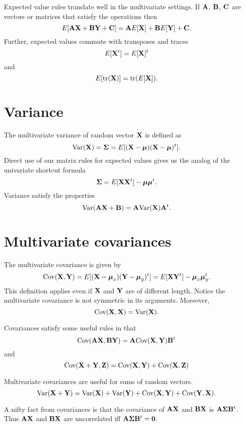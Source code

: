 Expected value rules translate well in the multivariate settings.
If $\mathbf{A}$, $\mathbf{B}$, $\mathbf{C}$ are vectors or matrices that satisfy the operations then 
$$
E[\mathbf{A} \mathbf{X} + \mathbf{B} \mathbf{Y} + \mathbf{C}] = \mathbf{A} E[\mathbf{X}] + \mathbf{B} E[\mathbf{Y}] + \mathbf{C}.
$$
Further, expected values commute with transposes and traces
$$
E[\mathbf{X}^t] = E[\mathbf{X}]^t
$$
and 
$$
E[\mbox{tr}(\mathbf{X})] = \mbox{tr}(E[\mathbf{X}]).
$$

\section{Variance}
The multivariate variance of random vector $\mathbf{X}$ is defined as 
$$
\mbox{Var}(\mathbf{X}) = \boldsymbol{\Sigma} = E[(\mathbf{X} - \boldsymbol{\mu})(\mathbf{X} - \boldsymbol{\mu})^t].
$$
Direct use of our matrix rules for expected values gives us the
analog of the univariate shortcut formula
$$
\boldsymbol{\Sigma} = E[\mathbf{X}\mathbf{X}^t] - \boldsymbol{\mu} \boldsymbol{\mu}^t.
$$
Variance satisfy the properties 
$$
\mbox{Var}(\mathbf{A} \mathbf{X} + \mathbf{B}) = \mathbf{A} \mbox{Var}(\mathbf{X}) \mathbf{A}^t.
$$

\section{Multivariate covariances}
The multivariate covariance is given by 
$$
\mbox{Cov}(\mathbf{X}, \mathbf{Y}) = E[(\mathbf{X} - \boldsymbol{\mu}_x)(\mathbf{Y} - \boldsymbol{\mu}_y)^t]
= E[\mathbf{X} \mathbf{Y}^t] - \boldsymbol{\mu}_x \boldsymbol{\mu}_y^t.
$$
This definition applies even if $\mathbf{X}$ and $\mathbf{Y}$ are of different length.
Notice the multivariate covariance is not symmetric in its arguments. 
Moreover, 
$$
\mbox{Cov}(\mathbf{X}, \mathbf{X}) = \mbox{Var}(\mathbf{X}).
$$

Covariances satisfy some useful rules in that
$$
\mbox{Cov}(\mathbf{A} \mathbf{X}, \mathbf{B} \mathbf{Y}) = \mathbf{A} \mbox{Cov}(\mathbf{X}, \mathbf{Y}) \mathbf{B}^t
$$
and
$$
\mbox{Cov}(\mathbf{X} + \mathbf{Y}, \mathbf{Z}) = \mbox{Cov}(\mathbf{X}, \mathbf{Y}) + \mbox{Cov}(\mathbf{X}, \mathbf{Z})
$$

Multivariate covariances are useful for sums of random vectors. 
$$
\mbox{Var}(\mathbf{X} + \mathbf{Y}) = \mbox{Var}(\mathbf{X}) + \mbox{Var}(\mathbf{Y}) + \mbox{Cov}(\mathbf{X}, \mathbf{Y}) + \mbox{Cov}(\mathbf{Y}, \mathbf{X}).
$$

A nifty fact from covariances is that the covariance of $\mathbf{A} \mathbf{X}$ and
$\mathbf{B} \mathbf{X}$ is $\mathbf{A} \boldsymbol{\Sigma} \mathbf{B}^t$. Thus $\mathbf{A} \mathbf{X}$ and $\mathbf{B} \mathbf{X}$ 
are uncorrelated iff $\mathbf{A} \boldsymbol{\Sigma} \mathbf{B}^t = \mathbf{0}.$

